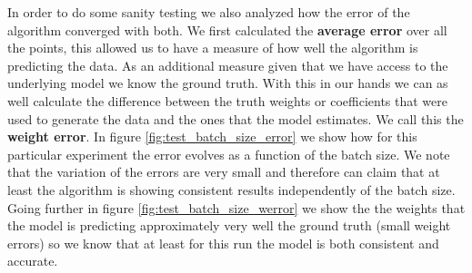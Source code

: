 \documentclass[11pt,a4paper]{article}
\begin{document}
In order to do some sanity testing we also analyzed how the error of the algorithm 
converged with both. We first calculated the \textbf{average error} over all the points, 
this allowed us to have a measure of how well the algorithm is predicting the data. 
As an additional measure given that we have access to the underlying model we know the 
ground truth. With this in our hands we can as well calculate the difference between 
the truth weights or coefficients that were used to generate the data and the ones that
the model estimates. We call this the \textbf{weight error}. In figure
\ref{fig:test_batch_size_error} we show how for this particular experiment the
error evolves as a function of the batch size. We note that the variation of the errors
are very small and therefore can claim that at least the algorithm is showing consistent
results independently of the batch size. Going further in figure 
\ref{fig:test_batch_size_werror} we show the the weights that the model is predicting
approximately very well the ground truth (small weight errors) so we know that at least
for this run the model is both consistent and accurate. 
\end{document}
